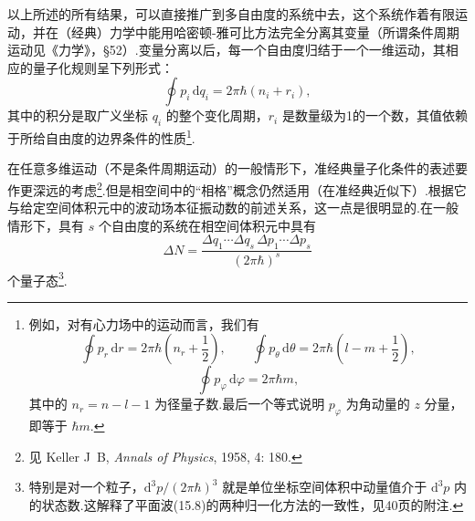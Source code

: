 以上所述的所有结果，可以直接推广到多自由度的系统中去，这个系统作着有限运动，并在（经典）力学中能用哈密顿-雅可比方法完全分离其变量（所谓条件周期运动见《力学》，§52）.变量分离以后，每一个自由度归结于一个一维运动，其相应的量子化规则呈下列形式：
\begin{equation}
  \oint p_i\,\mathrm{d}q_i=2\pi\hbar(n_i+r_i),
\end{equation}
其中的积分是取广义坐标 $q_i$ 的整个变化周期，$r_i$ 是数量级为1的一个数，其值依赖于所给自由度的边界条件的性质\footnote{例如，对有心力场中的运动而言，我们有
\begin{equation*}
  \oint p_r\,\mathrm{d}r=2\pi\hbar\left(n_r+\frac{1}{2}\right),\qquad
  \oint p_\theta\,\mathrm{d}\theta=2\pi\hbar\left(l-m+\frac{1}{2}\right),
\end{equation*}
\begin{equation*}
  \oint p_\varphi\,\mathrm{d}\varphi=2\pi\hbar m,
\end{equation*}
其中的 $n_r=n-l-1$ 为径量子数.最后一个等式说明 $p_\varphi$ 为角动量的 $z$ 分量，即等于 $\hbar m$.}.

在任意多维运动（不是条件周期运动）的一般情形下，准经典量子化条件的表述要作更深远的考虑\footnote{见 Keller J~B, \textit{Annals of Physics}, 1958, 4: 180.}.但是相空间中的“相格”概念仍然适用（在准经典近似下）.根据它与给定空间体积元中的波动场本征振动数的前述关系，这一点是很明显的.在一般情形下，具有 $s$ 个自由度的系统在相空间体积元中具有
\begin{equation}
  \Delta N=\frac{\Delta q_1\cdots\Delta q_s\,\Delta p_1\cdots\Delta p_s}{(2\pi\hbar)^s}
\end{equation}
个量子态\footnote{特别是对一个粒子，$\mathrm{d}^3p/(2\pi\hbar)^3$ 就是单位坐标空间体积中动量值介于 $\mathrm{d}^3p$ 内的状态数.这解释了平面波(15.8)的两种归一化方法的一致性，见40页的附注.}.


